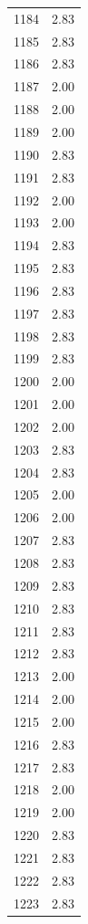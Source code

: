 \documentclass[a4paper,11pt]{article}
\begin{document}
\begin{center}
\begin{longtable}{|R{1.5cm}|R{2.5cm}|}
 1184  &         2.83 \\ 
 1185  &         2.83 \\ 
 1186  &         2.83 \\ 
 1187  &         2.00 \\ 
 1188  &         2.00 \\ 
 1189  &         2.00 \\ 
 1190  &         2.83 \\ 
 1191  &         2.83 \\ 
 1192  &         2.00 \\ 
 1193  &         2.00 \\ 
 1194  &         2.83 \\ 
 1195  &         2.83 \\ 
 1196  &         2.83 \\ 
 1197  &         2.83 \\ 
 1198  &         2.83 \\ 
 1199  &         2.83 \\ 
 1200  &         2.00 \\ 
 1201  &         2.00 \\ 
 1202  &         2.00 \\ 
 1203  &         2.83 \\ 
 1204  &         2.83 \\ 
 1205  &         2.00 \\ 
 1206  &         2.00 \\ 
 1207  &         2.83 \\ 
 1208  &         2.83 \\ 
 1209  &         2.83 \\ 
 1210  &         2.83 \\ 
 1211  &         2.83 \\ 
 1212  &         2.83 \\ 
 1213  &         2.00 \\ 
 1214  &         2.00 \\ 
 1215  &         2.00 \\ 
 1216  &         2.83 \\ 
 1217  &         2.83 \\ 
 1218  &         2.00 \\ 
 1219  &         2.00 \\ 
 1220  &         2.83 \\ 
 1221  &         2.83 \\ 
 1222  &         2.83 \\ 
 1223  &         2.83 \\ 

\end{longtable}
\end{center}
\end{document}
